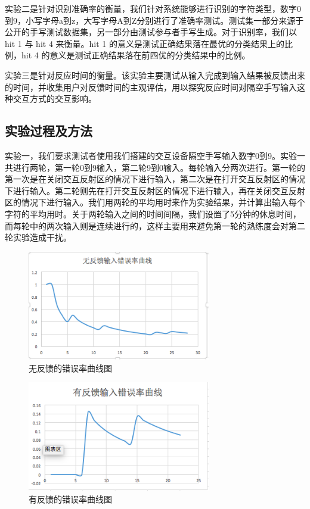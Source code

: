 \documentclass[10pt, twocolumn]{article}
\begin{document}
	实验二是针对识别准确率的衡量，我们针对系统能够进行识别的字符类型，数字0到9，小写字母a到z，大写字母A到Z分别进行了准确率测试。测试集一部分来源于公开的手写测试数据集，另一部分由测试参与者手写生成。对于识别率，我们以hit 1 与 hit 4 来衡量。hit 1 的意义是测试正确结果落在最优的分类结果上的比例，hit 4 的意义是测试正确结果落在前四优的分类结果中的比例。
	
	实验三是针对反应时间的衡量。该实验主要测试从输入完成到输入结果被反馈出来的时间，并收集用户对反馈时间的主观评估，用以探究反应时间对隔空手写输入这种交互方式的交互影响。

	\subsection{实验过程及方法}

	实验一，我们要求测试者使用我们搭建的交互设备隔空手写输入数字0到9。实验一共进行两轮，第一轮0到9输入，第二轮9到0输入。每轮输入分两次进行。第一轮的第一次是在关闭交互反射区的情况下进行输入，第二次是在打开交互反射区的情况下进行输入。第二轮则先在打开交互反射区的情况下进行输入，再在关闭交互反射区的情况下进行输入。我们用两轮的平均用时来作为实验结果，并计算出输入每个字符的平均用时。关于两轮输入之间的时间间隔，我们设置了5分钟的休息时间，而每轮中的两次输入则是连续进行的，这样主要用来避免第一轮的熟练度会对第二轮实验造成干扰。


\begin{figure}[htb]
\centering
\begin{minipage}[t]{1\linewidth}
\centering
\includegraphics[width=8cm]{has}
\caption{无反馈的错误率曲线图}
\label{fig: output_layer}
\end{minipage}
\end{figure}


\begin{figure}[htb]
\centering
\begin{minipage}[t]{1\linewidth}
\centering
\includegraphics[width=8cm]{hasnot}
\caption{有反馈的错误率曲线图}
\label{fig: output_layer}
\end{minipage}
\end{figure}
\end{document}
